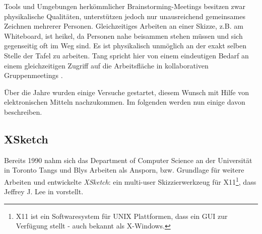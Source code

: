 
Tools und Umgebungen herkömmlicher Brainstorming-Meetings besitzen zwar physikalische Qualitäten, unterstützen jedoch nur unausreichend gemeinsames Zeichnen mehrerer Personen. Gleichzeitiges Arbeiten an einer Skizze, z.B. am Whiteboard, ist heikel, da Personen nahe beisammen stehen müssen und sich gegenseitig oft im Weg sind. Es ist physikalisch unmöglich an der exakt selben Stelle der Tafel zu arbeiten. Tang spricht hier von einem eindeutigen Bedarf an einem gleichzeitigen Zugriff auf die Arbeitsfläche in kollaborativen Gruppenmeetings \citep{Tang1991143}.

Über die Jahre wurden einige Versuche gestartet, diesem Wunsch mit Hilfe von elektronischen Mitteln nachzukommen. Im folgenden werden nun einige davon beschreiben.

\subsection{XSketch} 
Bereits 1990 nahm sich das Department of Computer Science an der Universität in Toronto Tangs und Blys Arbeiten als Ansporn, bzw. Grundlage für weitere Arbeiten und entwickelte \emph{XSketch}: ein multi-user Skizzierwerkzeug für X11\footnote{X11 ist ein Softwaresystem für UNIX Plattformen, dass ein \ac{GUI} zur Verfügung stellt - auch bekannt als X-Windows.}, dass Jeffrey J. Lee in \citep{Lee:1990:XMS:91478.91510} vorstellt.


